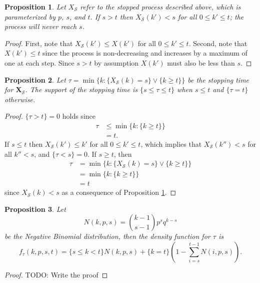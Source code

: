 \documentclass{article}
\newtheorem{prop}{Proposition}
\begin{document}
\begin{prop} \label{prop:sandt}
Let $X_\mathcal{S}$ refer to the stopped process described above, which
is parameterized by $p$, $s$, and $t$.  
If $s > t$ then 
$X_\mathcal{S}(k') < s$ for all $0 \leq k' \leq t$; the process will never
reach $s$. 
\end{prop}
\begin{proof}
First, note that $X_\mathcal{S}(k') \leq X(k')$ for all $0 \leq k' \leq t$.
Second, note that $X(k') \leq t$ since the process
is non-decreasing and increases by a maximum of one at each step.
Since $s > t$ by assumption $X(k')$ must also be less than $s$.
\end{proof}

\begin{prop}
Let $\tau = \min\{ k: \{X_\mathcal{S}(k) = s\} \vee \{k \geq t\} \}$ be 
the stopping time for $\mathbf{X_\mathcal{S}}$. The support of the 
stopping time is
$\{ s \leq \tau \leq t \}$ when $s \leq t$ and $\{\tau = t\}$ otherwise.
\end{prop}
\begin{proof}
$\{\tau > t \} = 0$ holds since 
\begin{align*}
\tau &\leq \min\{k : \{k \geq t\} \} \\
  & = t.
\end{align*}
If $s \leq t$ then 
$X_\mathcal{S}(k') \leq k'$ for all $0 \leq k' \leq t$, which implies
that $X_\mathcal{S}(k'') < s$ for all $k'' < s$, and $\{\tau < s\} = 0$. 
If $s \geq t$, then 
\begin{align*}
\tau &= \min\{k : \{X_\mathcal{S}(k) = s\} \vee \{k \geq t\} \} \\
  & = \min\{k : \{k \geq t\} \} \\
  & = t
\end{align*}
since $X_\mathcal{S}(k) < s$ as a consequence of Proposition \ref{prop:sandt}.
\end{proof}

\begin{prop}
Let
\begin{equation*}
N(k, p, s) = {k-1 \choose s-1} p^s q^{k-s}
\end{equation*}
be the Negative Binomial distribution, then the density function for $\tau$ is
\begin{equation*}
f_\tau(k, p, s, t) =  \{s \leq k < t\} N(k, p, s) + 
  \{k=t\} \left( 1 - \sum_{i=s}^{t-1} N(i, p, s) \right).
\end{equation*}
\end{prop}
\begin{proof}
TODO: Write the proof
\end{proof}
\end{document}
